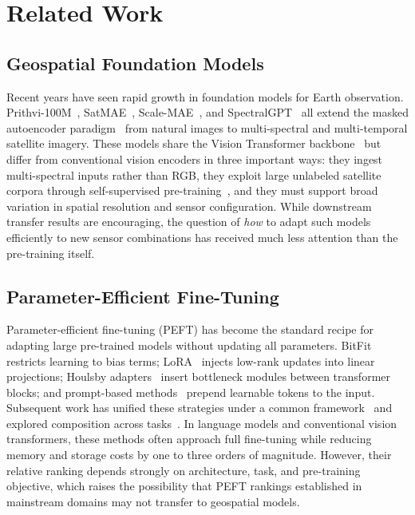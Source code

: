 \documentclass[11pt]{article}
\begin{document}
\section{Related Work}

\subsection{Geospatial Foundation Models}
Recent years have seen rapid growth in foundation models for Earth observation. Prithvi-100M~\cite{jakubik2023prithvi}, SatMAE~\cite{cong2022satmae}, Scale-MAE~\cite{reed2023scalemae}, and SpectralGPT~\cite{hong2024spectralgpt} all extend the masked autoencoder paradigm~\cite{he2022mae} from natural images to multi-spectral and multi-temporal satellite imagery. These models share the Vision Transformer backbone~\cite{dosovitskiy2021vit} but differ from conventional vision encoders in three important ways: they ingest multi-spectral inputs rather than RGB, they exploit large unlabeled satellite corpora through self-supervised pre-training~\cite{manas2021seco,wang2022ssl4eo}, and they must support broad variation in spatial resolution and sensor configuration. While downstream transfer results are encouraging, the question of \emph{how} to adapt such models efficiently to new sensor combinations has received much less attention than the pre-training itself.

\subsection{Parameter-Efficient Fine-Tuning}
Parameter-efficient fine-tuning (PEFT) has become the standard recipe for adapting large pre-trained models without updating all parameters. BitFit~\cite{zaken2022bitfit} restricts learning to bias terms; LoRA~\cite{hu2022lora} injects low-rank updates into linear projections; Houlsby adapters~\cite{houlsby2019adapter} insert bottleneck modules between transformer blocks; and prompt-based methods~\cite{lester2021prompt,jia2022vpt} prepend learnable tokens to the input. Subsequent work has unified these strategies under a common framework~\cite{he2022unified} and explored composition across tasks~\cite{pfeiffer2020adapterfusion}. In language models and conventional vision transformers, these methods often approach full fine-tuning while reducing memory and storage costs by one to three orders of magnitude. However, their relative ranking depends strongly on architecture, task, and pre-training objective, which raises the possibility that PEFT rankings established in mainstream domains may not transfer to geospatial models.
\end{document}
